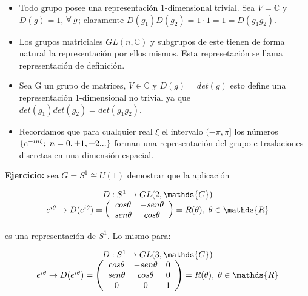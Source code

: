 \begin{itemize}
\item Todo grupo posee una representación 1-dimensional trivial. Sea $V=\mathds{C}$ y $D(g)=1$, $\forall \hspace{0.1cm} g$; claramente $D(g_1)D(g_2)=1\cdot 1=1=D(g_1g_2)$.
\item Los grupos matriciales $GL(n,\mathds{C})$ y subgrupos de este tienen de forma natural la representación por ellos mismos. Esta represetación se llama representación de definición.
\item Sea G un grupo de matrices, $V\in \mathds{C}$ y $D(g)=det(g)$ esto define una representación 1-dimensional no trivial ya que $det(g_1)det(g_2)=det(g_1g_2)$.
\item Recordamos que para cualquier real $\xi$ el intervalo $(-\pi, \pi]$ los números $\lbrace e^{-in\xi}; \hspace{0.1cm} n=0,\pm 1, \pm 2... \rbrace$ forman una representación del grupo e traslaciones discretas en una dimensión espacial.
\end{itemize}

\smallskip
\textbf{Ejercicio:} sea $G=S^1 \cong U(1)$ demostrar que la aplicación

$$\begin{array}{cc}
D: S^1 \to GL(2,\mathds{C})  \\
e^{i\theta} \to D(e^{i\theta})= \left (\begin{array}{cc}
cos \theta   & -sen \theta  \\
sen \theta   & cos \theta
\end{array} \right )=R( \theta), \hspace{0.1cm} \theta \in \mathds{R}
\end{array}$$

es una representación de $S^1$. Lo mismo para:

$$\begin{array}{cc}
D: S^1 \to GL(3,\mathds{C})  \\
e^{i\theta} \to D(e^{i\theta})= \left (\begin{array}{ccc}
cos \theta   & -sen \theta  & 0\\
sen \theta   & cos \theta & 0 \\
0 & 0 & 1
\end{array} \right )=R( \theta), \hspace{0.1cm} \theta \in \mathds{R}
\end{array}$$

